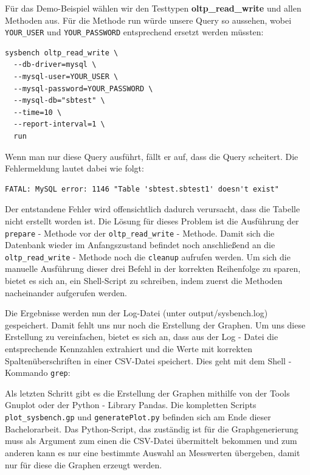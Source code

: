 Für das Demo-Beispiel wählen wir den Testtypen \textbf{oltp\_read\_write} und allen Methoden aus.
Für die Methode run würde unsere Query so aussehen, wobei \texttt{YOUR\_USER} und \texttt{YOUR\_PASSWORD}
entsprechend ersetzt werden müssten:

\begin{lstlisting}[style=custom_daniel,label={lst:sysbenchrun}]
sysbench oltp_read_write \
  --db-driver=mysql \
  --mysql-user=YOUR_USER \
  --mysql-password=YOUR_PASSWORD \
  --mysql-db="sbtest" \
  --time=10 \
  --report-interval=1 \
  run
\end{lstlisting}

Wenn man nur diese Query ausführt, fällt er auf, dass die Query scheitert.
Die Fehlermeldung lautet dabei wie folgt:
\begin{lstlisting}[style=custom_daniel,label={lst:error_withoutprepare}]
FATAL: MySQL error: 1146 "Table 'sbtest.sbtest1' doesn't exist"
\end{lstlisting}
Der entstandene Fehler wird offensichtlich dadurch verursacht, dass die Tabelle nicht erstellt worden ist.
Die Lösung für dieses Problem ist die Ausführung der \texttt{prepare} - Methode vor der \texttt{oltp\_read\_write} - Methode.
Damit sich die Datenbank wieder im Anfangszustand befindet noch anschließend an die \texttt{oltp\_read\_write} - Methode noch die \texttt{cleanup} aufrufen werden.
Um sich die manuelle Ausführung dieser drei Befehl in der korrekten Reihenfolge zu sparen, bietet es sich an, ein Shell-Script zu schreiben, indem zuerst die Methoden nacheinander aufgerufen werden.



Die Ergebnisse werden nun der Log-Datei (unter output/sysbench.log) gespeichert.
Damit fehlt uns nur noch die Erstellung der Graphen.
Um uns diese Erstellung zu vereinfachen, bietet es sich an, dass aus der Log - Datei die entsprechende Kennzahlen extrahiert und die Werte mit korrekten Spaltenüberschriften in einer CSV-Datei speichert.
Dies geht mit dem Shell - Kommando \texttt{grep}:



Als letzten Schritt gibt es die Erstellung der Graphen mithilfe von der Tools Gnuplot oder der Python - Library Pandas.
Die kompletten Scripts \texttt{plot\_sysbench.gp} und \texttt{generatePlot.py} befinden sich am Ende dieser Bachelorarbeit.
Das Python-Script, das zuständig ist für die Graphgenerierung muss als Argument zum einen
die CSV-Datei übermittelt bekommen und zum anderen kann es nur eine bestimmte Auswahl an
Messwerten übergeben, damit nur für diese die Graphen erzeugt werden.

